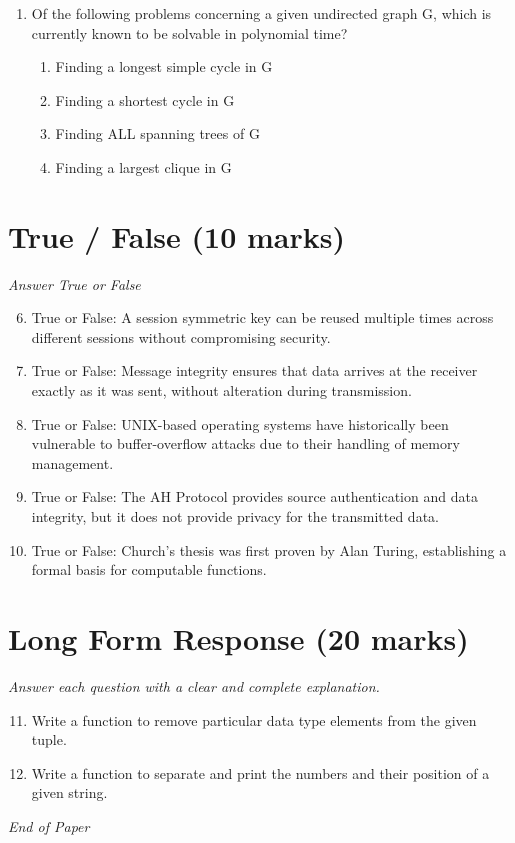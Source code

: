 \documentclass[12pt]{article}
\begin{document}
\begin{enumerate}[label=\arabic*.]
\begin{enumerate}[label=(\alph*)]
    \item Dynamically linked libraries
    \item Global variables
\end{enumerate}
\item Of the following problems concerning a given undirected graph G, which is currently known to be solvable in polynomial time?
\begin{enumerate}[label=(\alph*)]
    \item Finding a longest simple cycle in G
    \item Finding a shortest cycle in G
    \item Finding ALL spanning trees of G
    \item Finding a largest clique in G
\end{enumerate}
\end{enumerate}

\section*{True / False (10 marks)}
\textit{Answer True or False}
\begin{enumerate}[label=\arabic*.]
\setcounter{enumi}{5}
\item True or False: A session symmetric key can be reused multiple times across different sessions without compromising security.
\item True or False: Message integrity ensures that data arrives at the receiver exactly as it was sent, without alteration during transmission.
\item True or False: UNIX-based operating systems have historically been vulnerable to buffer-overflow attacks due to their handling of memory management.
\item True or False: The AH Protocol provides source authentication and data integrity, but it does not provide privacy for the transmitted data.
\item True or False: Church's thesis was first proven by Alan Turing, establishing a formal basis for computable functions.
\end{enumerate}

\section*{Long Form Response (20 marks)}
\textit{Answer each question with a clear and complete explanation.}
\begin{enumerate}[label=\arabic*.]
\setcounter{enumi}{10}
\item Write a function to remove particular data type elements from the given tuple.
\item Write a function to separate and print the numbers and their position of a given string.
\end{enumerate}

\vfill
\noindent\textit{End of Paper}
\end{document}
